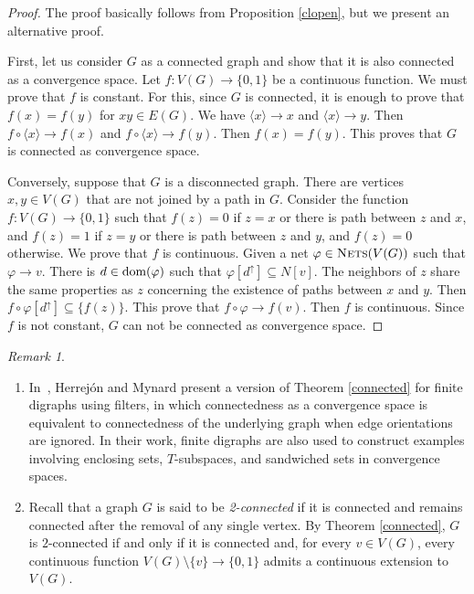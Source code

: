 \documentclass{amsart}
\theoremstyle{definition}
\theoremstyle{remark}
\newtheorem{remark}{Remark}[section]
\numberwithin{equation}{section}
\begin{document}
\begin{proof}
	The proof basically follows from Proposition \ref{clopen}, but we present an alternative proof. 
	
	First, let us consider $G$ as a connected graph and show that it is also connected as a convergence space. Let $f:V(G)\to\{0,1\}$ be a continuous function. We must prove that $f$ is constant. For this, since $G$ is connected, it is enough to prove that $f(x)=f(y)$ for $xy\in E(G)$. We have $\langle x\rangle \to x$ and $\langle x\rangle \to y$. Then $f\circ \langle x\rangle \to f(x)$ and $f\circ \langle x\rangle \to f(y)$. Then $f(x)=f(y)$. This proves that $G$ is connected as convergence space.
	
	Conversely, suppose that $G$ is a disconnected graph. There are vertices $x,y\in V(G)$ that are not joined by a path in $G$. Consider the function $f: V(G)\to \{0,1\}$ such that $f(z)=0$ if $z=x$ or there is path between $z$ and $x$,  and $f(z)=1$  if $z=y$ or there is path between $z$ and $y$, and $f(z)=0$ otherwise. We prove that $f$ is continuous. Given a net $\varphi\in\textsc{Nets}(V(G)) $ such that $\varphi \to v$. There is $d\in \hbox{dom}(\varphi)$ such that $\varphi [d^\uparrow]\subseteq N[v]$. The neighbors of $z$ share the same properties as $z$ concerning the existence of paths between $x$ and $y$. Then $f\circ \varphi[d^\uparrow]\subseteq \{f(z)\}$. This prove that $f\circ\varphi \to f(v)$. Then $f$ is continuous. Since $f$ is not constant, $G$ can not be connected as convergence space.
\end{proof}
\begin{remark}
	\text{}
	\begin{enumerate}
	
		\item In~\cite{mynardconnec}, Herrejón and Mynard present a version of Theorem \ref{connected} for finite digraphs using filters, in which connectedness as a convergence space is equivalent to connectedness of the underlying graph when edge orientations are ignored. In their work, finite digraphs are also used to construct examples involving enclosing sets, $T$-subspaces, and sandwiched sets in convergence spaces.
		
		\item Recall that a graph $G$ is said to be \emph{2-connected} if it is connected and remains connected after the removal of any single vertex. By Theorem \ref{connected}, $G$ is $2$-connected if and only if it is connected and, for every $v \in V(G)$, every continuous function $V(G)\setminus\{v\} \to \{0,1\}$ admits a continuous extension to $V(G)$.
	\end{enumerate}
\end{remark}
\end{document}
